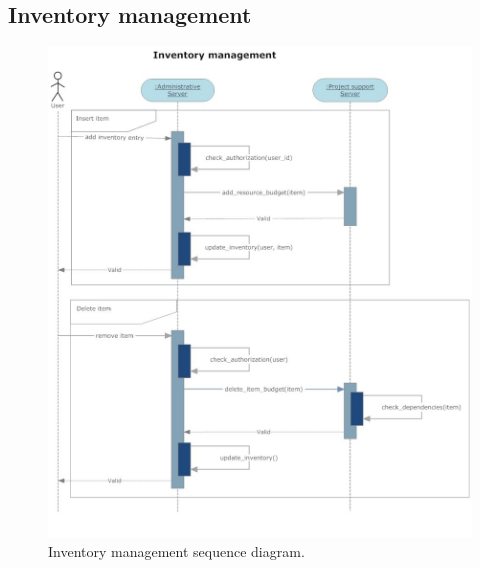 \subsection{Inventory management}
\begin{figure}
\begin{centering}
\includegraphics[scale=0.45]{assign3/sdraw/imgs/inventory.jpg}
\caption{Inventory management sequence diagram.}
\label{3img:[sequence]inventory}
\end{centering}
\end{figure}

